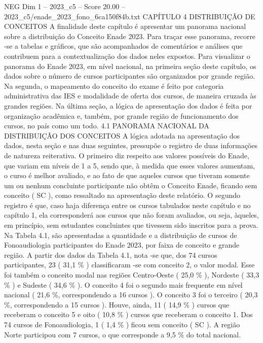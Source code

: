 \begin{textsample}{NEG Dim 1 – 2023\_c5 – Score 20.00 – 2023\_c5/enade\_2023\_fono\_6ca150f84b.txt}  \label{ex:f1_neg_422}
CAPÍTULO 4 DISTRIBUIÇÃO DE CONCEITOS A finalidade deste capítulo é apresentar um panorama nacional sobre a distribuição do Conceito Enade 2023.
Para traçar esse panorama, recorre -se a tabelas e gráficos, que são acompanhados de comentários e análises que contribuem para a contextualização dos dados neles expostos.
Para visualizar o panorama do Enade 2023, em nível nacional, na primeira seção deste capítulo, os dados sobre o número de cursos participantes são organizados por grande região.
Na segunda, o mapeamento do conceito do exame é feito por categoria administrativa das IES e modalidade de oferta dos cursos, de maneira cruzada às grandes regiões.
Na última seção, a lógica de apresentação dos dados é feita por organização acadêmica e, também, por grande região de funcionamento dos cursos, no país como um todo. 4.1 PANORAMA NACIONAL DA DISTRIBUIÇÃO DOS CONCEITOS A lógica adotada na apresentação dos dados, nesta seção e nas duas seguintes, pressupõe o registro de duas informações de natureza reiterativa.
O primeiro diz respeito aos valores possíveis do Enade, que variam em níveis de 1 a 5, sendo que, à medida que esses valores aumentam, o curso é melhor avaliado, e ao fato de que aqueles cursos que tiveram somente um ou nenhum concluinte participante não obtêm o Conceito Enade, ficando sem conceito ( SC ), como ressaltado na apresentação deste relatório.
O segundo registro é que, caso haja diferença entre os cursos tabulados neste capítulo e no capítulo 1, ela corresponderá aos cursos que não foram avaliados, ou seja, àqueles, em princípio, sem estudantes concluintes que tivessem sido inscritos para a prova.
Na Tabela 4.1, são apresentadas a quantidade e a distribuição de cursos de Fonoaudiologia participantes do Enade 2023, por faixa de conceito e grande região.
A partir dos dados da Tabela 4.1, nota -se que, dos 74 cursos participantes, 23 ( 31,1 \% ) classificaram -se com conceito 2, o valor modal.
Esse foi também o conceito modal nas regiões Centro-Oeste ( 25,0 \% ), Nordeste ( 33,3 \% ) e Sudeste ( 34,6 \% ).
O conceito 4 foi o segundo mais frequente em nível nacional ( 21,6 \%, correspondendo a 16 cursos ).
O conceito 3 foi o terceiro ( 20,3 \%, correspondendo a 15 cursos ).
Houve, ainda, 11 ( 14,9 \% ) cursos que receberam o conceito 5 e oito ( 10,8 \% ) cursos que receberam o conceito 1.
Dos 74 cursos de Fonoaudiologia, 1 ( 1,4 \% ) ficou sem conceito ( SC ).
A região Norte participou com 7 cursos, o que corresponde a 9,5 \% do total nacional.

\end{textsample}
